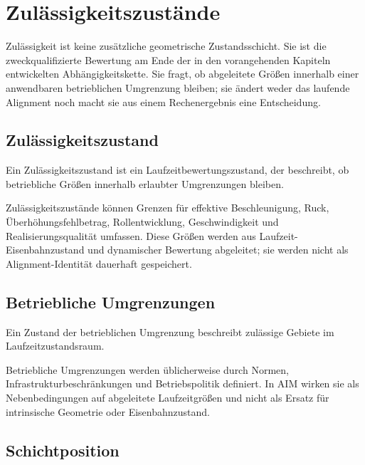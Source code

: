 
\chapter{Zulässigkeitszustände}
\label{chap:admissibility-states}

Zulässigkeit ist keine zusätzliche geometrische Zustandsschicht. Sie ist die
zweckqualifizierte Bewertung am Ende der in den vorangehenden Kapiteln
entwickelten Abhängigkeitskette. Sie fragt, ob abgeleitete Größen innerhalb
einer anwendbaren betrieblichen Umgrenzung bleiben; sie ändert weder das
laufende Alignment noch macht sie aus einem Rechenergebnis eine Entscheidung.

\section{Zulässigkeitszustand}

\begin{definition}[Zulässigkeitszustand]
\label{def:admissibility-state}
Ein Zulässigkeitszustand ist ein Laufzeitbewertungszustand, der beschreibt, ob
betriebliche Größen innerhalb erlaubter Umgrenzungen bleiben.
\end{definition}

Zulässigkeitszustände können Grenzen für effektive Beschleunigung, Ruck,
Überhöhungsfehlbetrag, Rollentwicklung, Geschwindigkeit und
Realisierungsqualität umfassen. Diese Größen werden aus
Laufzeit-Eisenbahnzustand und dynamischer Bewertung abgeleitet; sie werden
nicht als Alignment-Identität dauerhaft gespeichert.

\section{Betriebliche Umgrenzungen}

\begin{definition}
\label{def:operational-envelope-state}
Ein Zustand der betrieblichen Umgrenzung beschreibt zulässige Gebiete im
Laufzeitzustandsraum.
\end{definition}

Betriebliche Umgrenzungen werden üblicherweise durch Normen,
Infrastrukturbeschränkungen und Betriebspolitik definiert. In AIM wirken sie
als Nebenbedingungen auf abgeleitete Laufzeitgrößen und nicht als Ersatz für
intrinsische Geometrie oder Eisenbahnzustand.

\section{Schichtposition}

